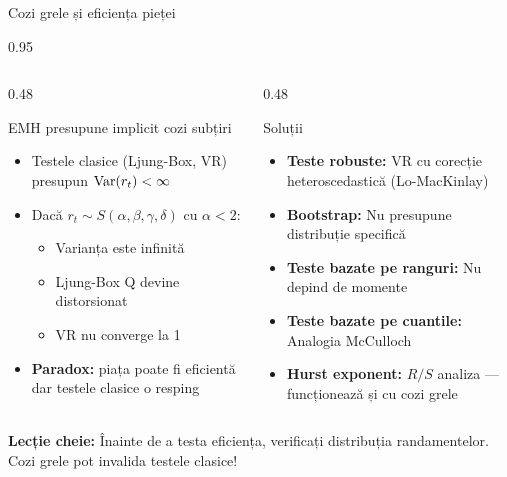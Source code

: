 \documentclass[9pt, aspectratio=169, t]{beamer}
\begin{document}
\begin{frame}{Cozi grele și eficiența pieței}
    \begin{cminipage}{0.95\textwidth}
\begin{columns}[T]
\begin{column}{0.48\textwidth}
\begin{block}{EMH presupune implicit cozi subțiri}
\begin{itemize}\setlength{\itemsep}{0pt}
    \item Testele clasice (Ljung-Box, VR) presupun $\text{Var}(r_t) < \infty$
    \item Dacă $r_t \sim S(\alpha, \beta, \gamma, \delta)$ cu $\alpha < 2$:
    \begin{itemize}\setlength{\itemsep}{0pt}
        \item Varianța este infinită
        \item Ljung-Box Q devine distorsionat
        \item VR nu converge la 1
    \end{itemize}
    \item \textbf{Paradox:} piața poate fi eficientă dar testele clasice o resping
\end{itemize}
\end{block}
\end{column}
\begin{column}{0.48\textwidth}
\begin{block}{Soluții}
\begin{itemize}\setlength{\itemsep}{0pt}
    \item \textbf{Teste robuste:} VR cu corecție heteroscedastică (Lo-MacKinlay)
    \item \textbf{Bootstrap:} Nu presupune distribuție specifică
    \item \textbf{Teste bazate pe ranguri:} Nu depind de momente
    \item \textbf{Teste bazate pe cuantile:} Analogia McCulloch
    \item \textbf{Hurst exponent:} $R/S$ analiza --- funcționează și cu cozi grele
\end{itemize}
\end{block}
\end{column}
\end{columns}

\vspace{0.2cm}
\begin{alertblock}{}
    {\small \textbf{Lecție cheie:} Înainte de a testa eficiența, verificați distribuția randamentelor. Cozi grele pot invalida testele clasice!}
\end{alertblock}
    \end{cminipage}
\end{frame}
\end{document}
